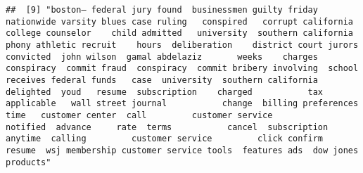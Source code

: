 \documentclass[
]{article}
\begin{document}
\begin{verbatim}
##  [9] "boston— federal jury found  businessmen guilty friday   nationwide varsity blues case ruling   conspired   corrupt california college counselor    child admitted   university  southern california   phony athletic recruit    hours  deliberation    district court jurors convicted  john wilson  gamal abdelaziz       weeks    charges   conspiracy  commit fraud  conspiracy  commit bribery involving  school  receives federal funds   case  university  southern california    delighted  youd   resume  subscription    charged           tax          applicable   wall street journal           change  billing preferences   time   customer center  call         customer service            notified  advance     rate  terms           cancel  subscription  anytime  calling         customer service         click confirm  resume  wsj membership customer service tools  features ads  dow jones products"                                                                                                                                                                                                                                                                                                                                                                                                                                                                                                                                                                                                                                                                                                                                                                                                                                                                                                                                                                                                                                                                                                                                                                                                                                                                                                                                                                                                                                                                                                                                                                                                                                                                                                                                                                                                                                                                                                                                                                                                                                                                                                                                                                                                                                                                                                                                                                                                                                                                                                                
\end{verbatim}
\end{document}
